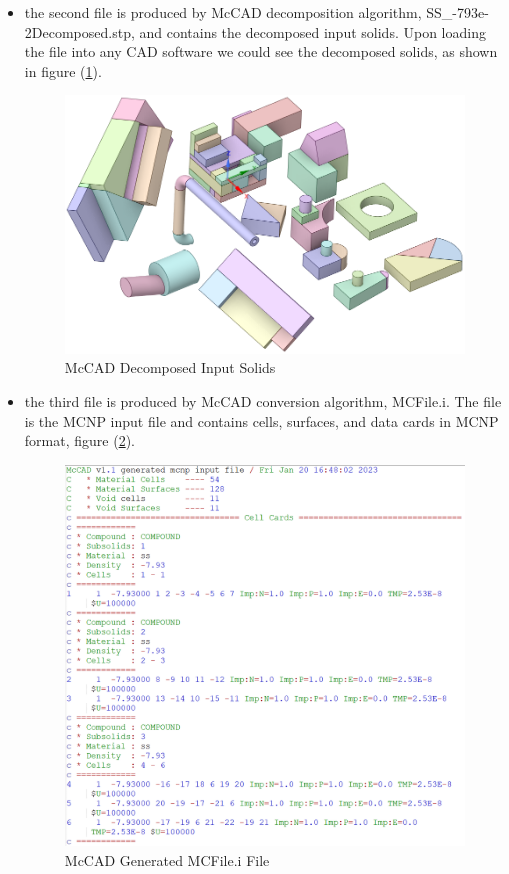 \documentclass[12pt, a4paper, titlepage]{article}
\begin{document}
\begin{enumerate}
\begin{itemize}
    \item the second file is produced by McCAD decomposition algorithm, SS\_-793e-2Decomposed.stp, and contains the decomposed input solids. Upon loading the file into any CAD software we could see the decomposed solids, as shown in figure (\ref{fig:Decomposed Solids}).
	\begin{figure}[h!]
		\centering
		\includegraphics[scale=0.4]{figures/decomposedSolids.png}
		\caption{McCAD Decomposed Input Solids}
		\label{fig:Decomposed Solids}
	\end{figure}

	\item the third file is produced by McCAD conversion algorithm, MCFile.i. The file is the MCNP input file and contains cells, surfaces, and data cards in MCNP format, figure (\ref{fig:MCFile}).
	\begin{figure}[h!]
		\centering
		\includegraphics[scale=0.55]{figures/cellCards.png}
		\caption{McCAD Generated MCFile.i File}
		\label{fig:MCFile}
	\end{figure}


\end{itemize}
\end{enumerate}
\end{document}
